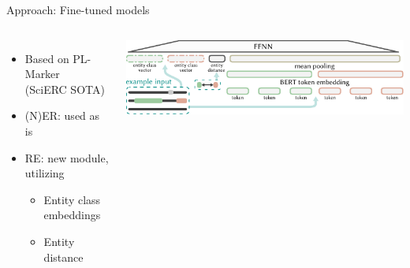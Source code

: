 \documentclass[en,16:9,smallfoot]{sdqbeamer}
\begin{document}
   \begin{frame}{Approach: Fine-tuned models}
   \begin{columns}
           \begin{itemize}
               \item Based on PL-Marker\\(SciERC SOTA)
               \item (N)ER: used as is
               \item RE: new module, utilizing
               \begin{itemize}
                   \item Entity class embeddings
                   \item Entity distance
               \end{itemize}
           \end{itemize}
           \includegraphics[width=\linewidth]{imgs/ffnn_re_sub_visual_v2}
   \end{columns}
   \end{frame}
\end{document}
